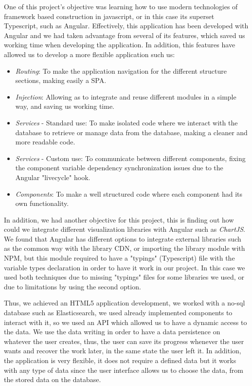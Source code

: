 \documentclass[a4paper, 12pt, english]{book}
\begin{document}
One of this project's objective was learning how to use modern technologies of framework based construction in javascript, or in this case its superset Typescript, such as Angular. Effectively, this application has been developed with Angular and we had taken advantage from several of its features, which saved us working time when developing the application. In addition, this features have allowed us to develop a more flexible application such us:
\begin{itemize}
    \item \textit{Routing}: To make the application navigation for the different structure sections, making easily a SPA.
    \item \textit{Injection}: Allowing as to integrate and reuse different modules in a simple way, and saving us working time.
    \item \textit{Services} - Standard use: To make isolated code where we interact with the database to retrieve or manage data from the database, making a cleaner and more readable code.
    \item \textit{Services} - Custom use: To communicate between different components, fixing the component variable dependency synchronization issues due to the Angular "livecycle" hook.
    \item \textit{Components}: To make a well structured code where each component had its own functionality.
\end{itemize}

In addition, we had another objective for this project, this is finding out how could we integrate different visualization libraries with Angular such as \textit{ChartJS}. We found that Angular has different options to integrate external libraries such as the common way with the library CDN, or importing the library module with NPM, but this module required to have a "typings" (Typescript) file with the variable types declaration in order to have it work in our project. In this case we used both techniques due to missing "typings" files for some libraries we used, or due to limitations by using the second option.

Thus, we achieved an HTML5 application development, we worked with a no-sql database such as Elasticsearch, we used already implemented components to interact with it, so we used an API which allowed us to have a dynamic access to the data. We use the data writing in order to have a data persistence on whatever the user creates, thus, the user can save its progress whenever the user wants and recover the work later, in the same state the user left it. In addition, the application is very flexible, it does not require a defined data but it works with any type of data since the user interface allows us to choose the data, from the stored data on the database.
\end{document}
